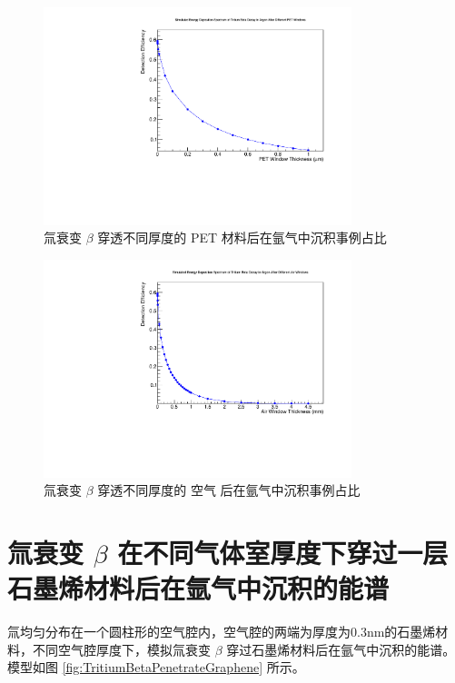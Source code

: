 \begin{figure}[htbp]
	\centering
	\includegraphics[width=0.8\textwidth]{figures/PETThickness.pdf}
	\caption{氚衰变 $\beta$ 穿透不同厚度的 PET 材料后在氩气中沉积事例占比}
	\label{fig:PETThickness}
\end{figure}

\begin{figure}[htbp]
	\centering
	\includegraphics[width=0.8\textwidth]{figures/AirNEdep.pdf}
	\caption{氚衰变 $\beta$ 穿透不同厚度的 空气 后在氩气中沉积事例占比}
	\label{fig:AirThickness}
\end{figure}

\section{氚衰变 $\beta$ 在不同气体室厚度下穿过一层石墨烯材料后在氩气中沉积的能谱}

氚均匀分布在一个圆柱形的空气腔内，空气腔的两端为厚度为0.3nm的石墨烯材料，不同空气腔厚度下，模拟氚衰变 $\beta$ 穿过石墨烯材料后在氩气中沉积的能谱。模型如图 \ref{fig:TritiumBetaPenetrateGraphene} 所示。

